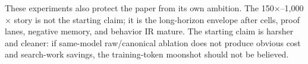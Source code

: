 These experiments also protect the paper from its own ambition. The 150$\times$--1,000$\times$ story is not the starting claim; it is the long-horizon envelope after cells, proof lanes, negative memory, and behavior IR mature. The starting claim is harsher and cleaner: if same-model raw/canonical ablation does not produce obvious cost and search-work savings, the training-token moonshot should not be believed.

